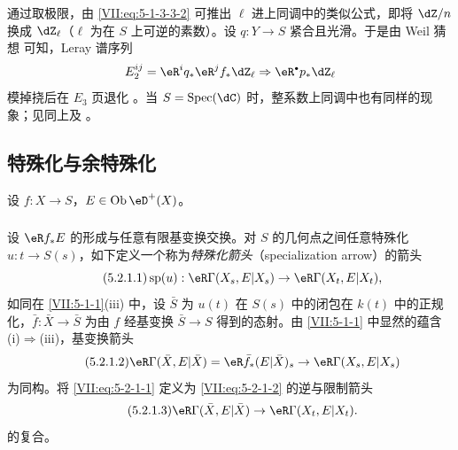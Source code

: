 通过取极限，由 \eqref{VII:eq:5-1-3-3-2} 可推出 $\ell$ 进上同调中的类似公式，即将 $\dZ/n$ 换成 $\dZ_\ell$（$\ell$ 为在 $S$ 上可逆的素数）。设 $q:Y\to S$ 紧合且光滑。于是由 Weil 猜想 \cite{de74,de80} 可知，Leray 谱序列
\[
  E_2^{i j} = \eR^i q_\ast \eR^j f_\ast \dZ_\ell \Rightarrow \eR^\bullet p_\ast \dZ_\ell
\]
模掉挠后在 $E_3$ 页退化 \cite[\S 6]{de71-1}。当 $S=\spec(\dC)$ 时，整系数上同调中也有同样的现象；见同上及 \cite[3.2.13]{de71-2}。

\subsection{特殊化与余特殊化}\label{VII:5-2}

设 $f:X\to S$，$E\in\ob\eD^+(X)$。

\subsubsection{}\label{VII:5-2-1}

设 $\eR f_\ast E$ 的形成与任意有限基变换交换。对 $S$ 的几何点之间任意特殊化 $u:t\to S(s)$，如下定义一个称为\emph{特殊化箭头}（specialization arrow）的箭头
\begin{equation*}\tag{5.2.1.1}\label{VII:eq:5-2-1-1}
  \spe(u):\eR\Gamma(X_s,E|X_s) \to \eR\Gamma(X_t,E|X_t) \text{,}
\end{equation*}
如同在 \ref{VII:5-1-1}(iii) 中，设 $\bar S$ 为 $u(t)$ 在 $S(s)$ 中的闭包在 $k(t)$ 中的正规化，$\bar f:\bar X\to \bar S$ 为由 $f$ 经基变换 $\bar S\to S$ 得到的态射。由 \ref{VII:5-1-1} 中显然的蕴含 (i)$\Rightarrow$(iii)，基变换箭头
\begin{equation*}\tag{5.2.1.2}\label{VII:eq:5-2-1-2}
  \eR\Gamma(\bar X,E|\bar X)=\eR\bar f_\ast (E|\bar X)_s \to \eR\Gamma(X_s,E|X_s)
\end{equation*}
为同构。将 \eqref{VII:eq:5-2-1-1} 定义为 \eqref{VII:eq:5-2-1-2} 的逆与限制箭头
\begin{equation*}\tag{5.2.1.3}\label{VII:eq:5-2-1-3}
  \eR\Gamma(\bar X,E|\bar X) \to \eR\Gamma(X_t,E|X_t) \text{.}
\end{equation*}
的复合。

\subsubsection{}\label{VII:5-2-2}

